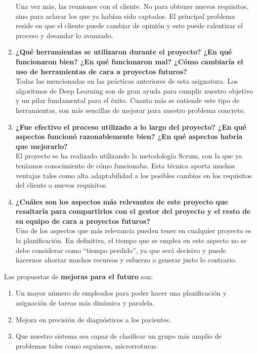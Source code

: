 \begin{enumerate}
				Una vez más, las reuniones con el cliente. No para obtener nuevos requisitos, sino para aclarar los que ya habían sido captados. El principal problema reside en que el cliente puede cambiar de opinión y esto puede ralentizar el proceso y desandar lo avanzado.
				
	\item \textbf{¿Qué herramientas se utilizaron durante el proyecto? ¿En qué funcionaron bien? ¿En qué funcionaron mal? ¿Cómo cambiaría el uso de herramientas de cara a proyectos futuros?} \\
	
	Todas las mencionadas en las prácticas anteriores de esta asignatura. Los algoritmos de Deep Learning son de gran ayuda para cumplir nuestro objetivo y un pilar fundamental para el éxito. Cuanto más se entiende este tipo de herramientas, son más sencillas de mejorar para nuestro problema concreto.
	
	\item \textbf{¿Fue efectivo el proceso utilizado a lo largo del proyecto? ¿En qué aspectos funcionó razonablemente bien? ¿En qué aspectos habría que mejorarlo?} \\
	
	El proyecto se ha realizado utilizando la metodología Scrum, con la que ya teníamos conocimiento de cómo funcionaba. Esta técnica aporta muchas ventajas tales como alta adaptabilidad a los posibles cambios en los requisitos del cliente o nuevos requisitos. 
	
	\item \textbf{¿Cuáles son los aspectos más relevantes de este proyecto que resaltaría para compartirlos con el gestor del proyecto y el resto de su equipo de cara a proyectos futuros?} \\ 
	
	Uno de los aspectos que más relevancia pueden tener en cualquier proyecto es la planificación. En definitiva, el tiempo que se emplea en este aspecto no se debe considerar como ``tiempo perdido'', ya que será decisivo y puede hacernos ahorrar muchos recursos y esfuerzo o generar justo lo contrario.
		
\end{enumerate}

Las propuestas de \textbf{mejoras para el futuro} son:

\begin{enumerate}
	\item Un mayor número de empleados para poder hacer una planificación y asignación de tareas más dinámica y paralela.
	\item Mejora en precisión de diagnósticos a los pacientes.
	\item Que nuestro sistema sea capaz de clasificar un grupo más amplio de problemas tales como esguinces, microrroturas.
\end{enumerate}

%
%

       
